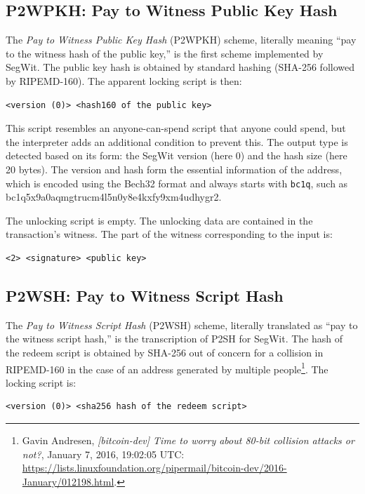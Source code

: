 \documentclass[
  a5paper,
  smalldemyvopaper,10pt,twoside,onecolumn,openright,extrafontsizes,hidelinks]{memoir}
\begin{document}
\subsection{P2WPKH: Pay to Witness Public Key
Hash}\label{p2wpkh-pay-to-witness-public-key-hash}

The \emph{Pay to Witness Public Key Hash} (P2WPKH) scheme, literally
meaning ``pay to the witness hash of the public key,'' is the first
scheme implemented by SegWit. The public key hash is obtained by
standard hashing (SHA-256 followed by RIPEMD-160). The apparent locking
script is then:

\begin{verbatim}
<version (0)> <hash160 of the public key>
\end{verbatim}

This script resembles an anyone-can-spend script that anyone could
spend, but the interpreter adds an additional condition to prevent this.
The output type is detected based on its form: the SegWit version (here
0) and the hash size (here 20 bytes). The version and hash form the
essential information of the address, which is encoded using the Bech32
format and always starts with \texttt{bc1q}, such as
bc1q5x9a0aqmgtrucm4l5n0y8e4kxfy9xm4udhygr2.

The unlocking script is empty. The unlocking data are contained in the
transaction's witness. The part of the witness corresponding to the
input is:

\begin{verbatim}
<2> <signature> <public key>
\end{verbatim}

\subsection{P2WSH: Pay to Witness Script
Hash}\label{p2wsh-pay-to-witness-script-hash}

The \emph{Pay to Witness Script Hash} (P2WSH) scheme, literally
translated as ``pay to the witness script hash,'' is the transcription
of P2SH for SegWit. The hash of the redeem script is obtained by SHA-256
out of concern for a collision in RIPEMD-160 in the case of an address
generated by multiple people\footnote{Gavin Andresen,
  \emph{{[}bitcoin-dev{]} Time to worry about 80-bit collision attacks
  or not?}, January 7, 2016, 19:02:05 UTC:
  \url{https://lists.linuxfoundation.org/pipermail/bitcoin-dev/2016-January/012198.html}.}.
The locking script is:

\begin{verbatim}
<version (0)> <sha256 hash of the redeem script>
\end{verbatim}
\end{document}
